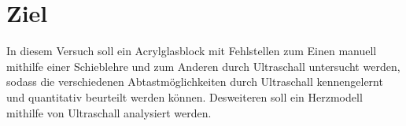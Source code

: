 \section{Ziel}
\label{sec:Ziel}
In diesem Versuch soll ein Acrylglasblock mit Fehlstellen zum Einen manuell mithilfe einer Schieblehre
und zum Anderen durch Ultraschall untersucht werden, sodass die verschiedenen Abtastmöglichkeiten
durch Ultraschall kennengelernt und quantitativ beurteilt werden können. Desweiteren
soll ein Herzmodell mithilfe von Ultraschall analysiert werden.
